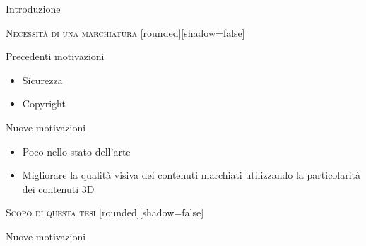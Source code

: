 \documentclass{beamer}
\begin{document}
\begin{section}{Introduzione}
\begin{frame}[t]{\textsc{Necessit\`{a} di una marchiatura}}
	[rounded][shadow=false]
\begin{center}
\begin{block}{Precedenti motivazioni}
\begin{itemize}
\item  Sicurezza
\item  Copyright
\end{itemize}
\end{block}
\vspace{1em}
\begin{block}{Nuove motivazioni}
\begin{itemize}
\item Poco nello stato dell'arte
\item Migliorare la qualit\`{a} visiva dei contenuti marchiati utilizzando la particolarit\`{a} dei contenuti 3D
\end{itemize}
\end{block}
\end{center}
\end{frame}


\begin{frame}[t]{\textsc{Scopo di questa tesi}}
	[rounded][shadow=false]
\begin{center}
\begin{block}{}

\end{block}
\vspace{1em}
\begin{block}{Nuove motivazioni}

\end{block}
\end{center}
\end{frame}

\end{section}
\end{document}
